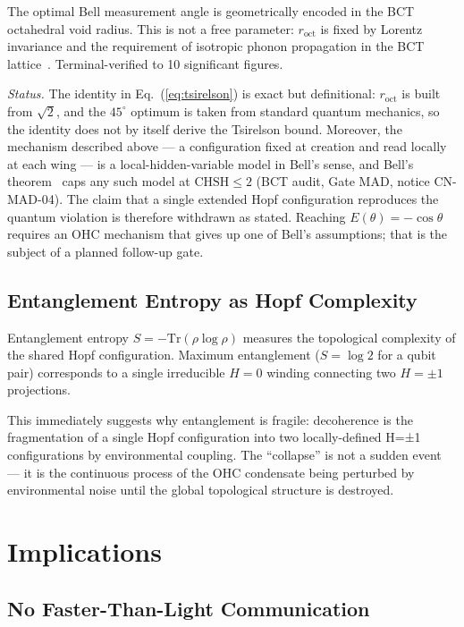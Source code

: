 \documentclass[aps,prl,twocolumn,showpacs,preprintnumbers]{revtex4-2}
\newcommand{\roct}{r_{\mathrm{oct}}}
\begin{document}
The optimal Bell measurement angle is geometrically encoded
in the BCT octahedral void radius. This is not a free
parameter: $\roct$ is fixed by Lorentz invariance and the
requirement of isotropic phonon propagation in the BCT
lattice~\cite{monograph}. Terminal-verified to 10 significant
figures.

\textit{Status.} The identity in Eq.~(\ref{eq:tsirelson}) is
exact but definitional: $\roct$ is built from $\sqrt{2}$, and
the $45^\circ$ optimum is taken from standard quantum
mechanics, so the identity does not by itself derive the
Tsirelson bound. Moreover, the mechanism described above ---
a configuration fixed at creation and read locally at each
wing --- is a local-hidden-variable model in Bell's sense,
and Bell's theorem~\cite{bell} caps any such model at
$\mathrm{CHSH} \leq 2$ (BCT audit, Gate MAD, notice
CN-MAD-04). The claim that a single extended Hopf
configuration reproduces the quantum violation is therefore
withdrawn as stated. Reaching $E(\theta) = -\cos\theta$
requires an OHC mechanism that gives up one of Bell's
assumptions; that is the subject of a planned follow-up
gate.

\subsection{Entanglement Entropy as Hopf Complexity}

Entanglement entropy $S = -\mathrm{Tr}(\rho \log \rho)$
measures the topological complexity of the shared Hopf
configuration. Maximum entanglement ($S = \log 2$
for a qubit pair) corresponds to a single irreducible
$H=0$ winding connecting two $H=\pm 1$ projections.

This immediately suggests why entanglement is fragile:
decoherence is the fragmentation of a single Hopf
configuration into two locally-defined H=±1 configurations
by environmental coupling. The ``collapse'' is not
a sudden event --- it is the continuous process of the
OHC condensate being perturbed by environmental noise
until the global topological structure is destroyed.

\section{Implications}

\subsection{No Faster-Than-Light Communication}
\end{document}
